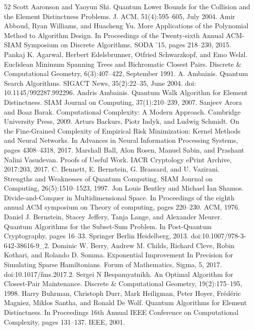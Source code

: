 \documentclass[10pt,a4paper]{article}
\begin{document}
\begin{thebibliography}{52}
 Scott Aaronson and Yaoyun Shi. Quantum Lower Bounds for the Collision and the Element Distinctness Problems. J. ACM, 51(4):595–605, July 2004.
 Amir Abboud, Ryan Williams, and Huacheng Yu. More Applications of the Polynomial Method to Algorithm Design. In Proceedings of the Twenty-sixth Annual ACM-SIAM Symposium on Discrete Algorithms, SODA ’15, pages 218–230, 2015.
 Pankaj K. Agarwal, Herbert Edelsbrunner, Otfried Schwarzkopf, and Emo Welzl. Euclidean Minimum Spanning Trees and Bichromatic Closest Pairs. Discrete \& Computational Geometry, 6(3):407–422, September 1991.
 A. Ambainis. Quantum Search Algorithms. SIGACT News, 35(2):22–35, June 2004. doi: 10.1145/992287.992296.
 Andris Ambainis. Quantum Walk Algorithm for Element Distinctness. SIAM Journal on Computing, 37(1):210–239, 2007.
 Sanjeev Arora and Boaz Barak. Computational Complexity: A Modern Approach. Cambridge University Press, 2009.
 Arturs Backurs, Piotr Indyk, and Ludwig Schmidt. On the Fine-Grained Complexity of Empirical Risk Minimization: Kernel Methods and Neural Networks. In Advances in Neural Information Processing Systems, pages 4308–4318, 2017.
 Marshall Ball, Alon Rosen, Manuel Sabin, and Prashant Nalini Vasudevan. Proofs of Useful Work. IACR Cryptology ePrint Archive, 2017:203, 2017.
 C. Bennett, E. Bernstein, G. Brassard, and U. Vazirani. Strengths and Weaknesses of Quantum Computing. SIAM Journal on Computing, 26(5):1510–1523, 1997.
 Jon Louis Bentley and Michael Ian Shamos. Divide-and-Conquer in Multidimensional Space. In Proceedings of the eighth annual ACM symposium on Theory of computing, pages 220–230. ACM, 1976.
 Daniel J. Bernstein, Stacey Jeffery, Tanja Lange, and Alexander Meurer. Quantum Algorithms for the Subset-Sum Problem. In Post-Quantum Cryptography, pages 16–33. Springer Berlin Heidelberg, 2013. doi:10.1007/978-3-642-38616-9\_2.
 Dominic W. Berry, Andrew M. Childs, Richard Cleve, Robin Kothari, and Rolando D. Somma. Exponential Improvement In Precision for Simulating Sparse Hamiltonians. Forum of Mathematics, Sigma, 5, 2017. doi:10.1017/fms.2017.2.
 Sergei N Bespamyatnikh. An Optimal Algorithm for Closest-Pair Maintenance. Discrete \& Computational Geometry, 19(2):175–195, 1998.
 Harry Buhrman, Christoph Durr, Mark Heiligman, Peter Hoyer, Frédéric Magniez, Miklos Santha, and Ronald De Wolf. Quantum Algorithms for Element Distinctness. In Proceedings 16th Annual IEEE Conference on Computational Complexity, pages 131–137. IEEE, 2001.

\end{thebibliography}
\end{document}
